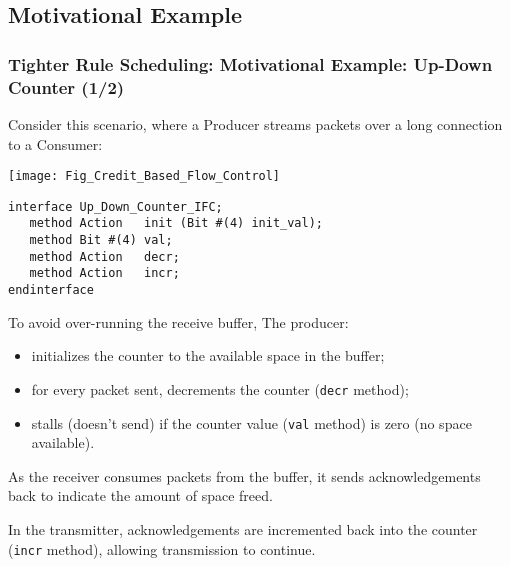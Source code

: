 \subsection{Motivational Example}

\begin{frame}[fragile]
\frametitle{Tighter Rule Scheduling: Motivational Example: Up-Down Counter (1/2)}

\footnotesize

Consider this scenario, where a Producer streams packets over a long
connection to a Consumer:

\begin{center}
 \texttt{[image: Fig\_Credit\_Based\_Flow\_Control]}
\end{center}

\begin{minipage}{0.38\textwidth}\scriptsize
\begin{Verbatim}[frame=single]
interface Up_Down_Counter_IFC;
   method Action   init (Bit #(4) init_val);
   method Bit #(4) val;
   method Action   decr;
   method Action   incr;
endinterface
\end{Verbatim}
\end{minipage}
\begin{minipage}{0.6\textwidth}

To avoid over-running the receive buffer,   The producer:

\begin{itemize}
 \item initializes the counter to the available space in the buffer;
 \item for every packet sent, decrements the counter  ({\tt decr} method);
 \item stalls (doesn't send) if the counter value ({\tt val} method) is zero (no space available).
\end{itemize}

As the receiver consumes packets from the buffer, it sends
acknowledgements back to indicate the amount of space freed.

\vspace{1ex}

In the transmitter, acknowledgements are incremented back into the
counter ({\tt incr} method), allowing transmission to continue.
\end{minipage}

\end{frame}


